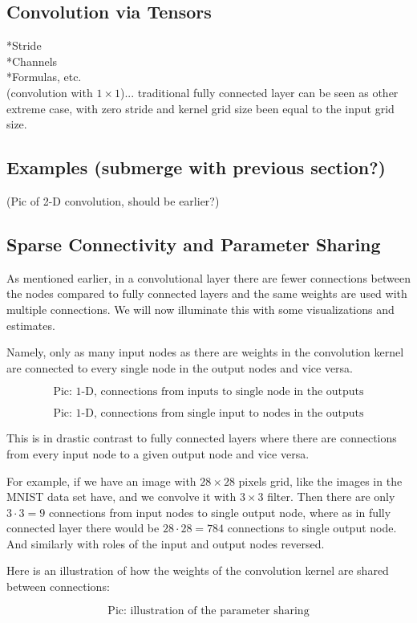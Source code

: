 \documentclass[]{article}
\begin{document}
\subsection{Convolution via Tensors}
*Stride\\
*Channels\\
*Formulas, etc.\\
(convolution with $1\times 1$)... traditional fully connected layer can be seen
as other extreme case, with zero stride and kernel grid size been equal to the
input grid size.

\subsection{Examples (submerge with previous section?)}
(Pic of 2-D convolution, should be earlier?)

\subsection{Sparse Connectivity and Parameter Sharing}
As mentioned earlier, in a convolutional layer there are fewer connections
between the nodes compared to fully connected layers and the same weights are used
with multiple connections. We will now illuminate this with some visualizations
and estimates.

Namely, only as many input nodes as there are weights in the convolution kernel
are connected to every single node in the output nodes and vice versa.

\[
\text{Pic: 1-D, connections from inputs to single node in the outputs}
\]

\[
\text{Pic: 1-D, connections from single input to nodes in the outputs}
\]

This is in drastic contrast to fully connected layers where there are connections
from every input node to a given output node and vice versa.

For example, if we have an image with $28 \times 28$ pixels grid, like the images
in the MNIST data set have, and we convolve it with $3 \times 3$ filter. Then
there are only $3 \cdot 3 = 9$ connections from input nodes to single output node,
where as in fully connected layer there would be $28 \cdot 28 = 784$ connections
to single output node. And similarly with roles of the input and output nodes reversed.

Here is an illustration of how the weights of the convolution kernel are shared
between connections:

\[
\text{Pic: illustration of the parameter sharing}
\]
\end{document}
